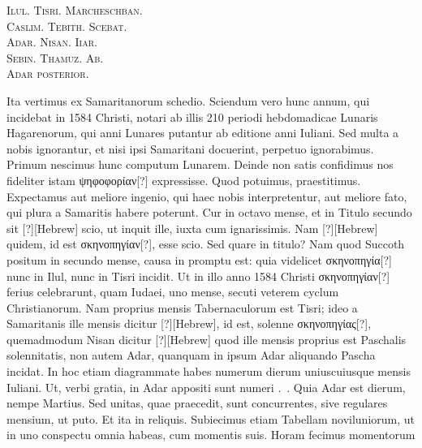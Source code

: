 %
\begin{center}
\newlength{\emenlen}
\parbox{\emenlen}{
  \textsc{Ilul. Tisri. Marcheschban.}\\
  \textsc{Caslim. Tebith. Scebat.}\\
  \textsc{Adar. Nisan. Iiar.}\\
  \textsc{Sebin. Thamuz. Ab.}\\
  \textsc{Adar posterior.}
}
\end{center}
%
Ita vertimus ex Samaritanorum schedio.
Sciendum vero hunc annum,
qui incidebat in 1584 Christi, notari ab illis 210 periodi hebdomadicae
Lunaris Hagarenorum, qui anni Lunares putantur ab editione
anni Iuliani.
Sed multa a nobis ignorantur, et nisi ipsi Samaritani
docuerint, perpetuo ignorabimus.
Primum nescimus hunc
computum Lunarem.
Deinde non satis confidimus nos fideliter
istam \textgreek{ψηφοφορίαν[?]} expressisse.
Quod potuimus, praestitimus.
Expectamus
aut meliore ingenio, qui haec nobis interpretentur, aut
meliore fato, qui plura a Samaritis habere poterunt.
Cur in
octavo mense, et in Titulo secundo sit \texthebrew{[?]}[Hebrew]
 scio, ut inquit ille,
iuxta cum ignarissimis.
Nam \texthebrew{[?]}[Hebrew] quidem,
 id est \textgreek{σκηνοπηγίαν[?]}, esse
scio.
Sed quare in titulo?
Nam quod Succoth positum in secundo
mense, causa in promptu est: quia videlicet \textgreek{σκηνοπηγία[?]}
 nunc in Ilul,
nunc in Tisri incidit. %
Ut in illo anno 1584 Christi
 \textgreek{σκηνοπηγίαν[?]} ferius
celebrarunt, quam Iudaei, uno mense, secuti veterem cyclum
Christianorum.
Nam proprius mensis Tabernaculorum est Tisri;
ideo a Samaritanis ille mensis dicitur \texthebrew{[?]}[Hebrew],
 id est, solenne \textgreek{σκηνοπηγίας[?]},
quemadmodum Nisan dicitur \texthebrew{[?]}[Hebrew] quod ille mensis proprius
est Paschalis solennitatis, non autem Adar, quanquam in
ipsum Adar aliquando Pascha incidat.
In hoc etiam diagrammate
habes numerum dierum uniuscuiusque mensis Iuliani.
Ut, verbi
gratia, in Adar appositi sunt numeri .~.
Quia Adar
est  dierum, nempe Martius.
Sed unitas, quae praecedit, sunt
concurrentes, sive regulares mensium, ut puto.
Et ita in reliquis.
Subiecimus etiam Tabellam noviluniorum, ut in uno conspectu
omnia habeas, cum momentis suis.
Horam fecimus momentorum
